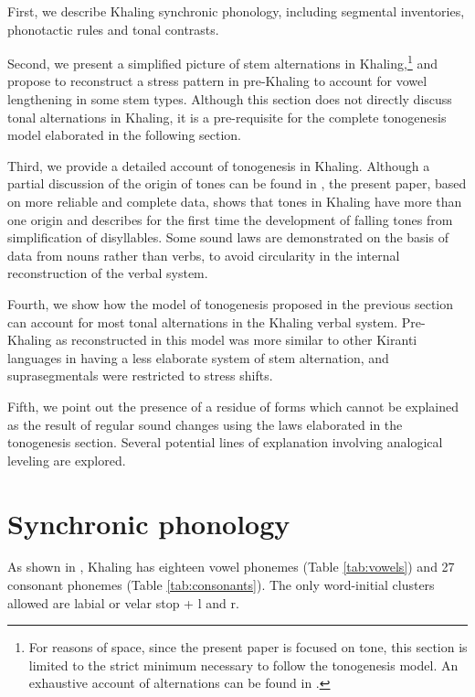 \documentclass[oldfontcommands,oneside,a4paper,11pt]{article}
\newcommand{\ipa}[1]{{\phon \mbox{#1}}} %
\begin{document}
First, we describe  Khaling synchronic phonology, including segmental inventories, phonotactic rules and tonal contrasts. 
 
Second, we present a simplified picture of stem alternations in Khaling,\footnote{For reasons of space, since the present paper is focused on tone, this section is limited to the strict minimum necessary to follow the tonogenesis model. An exhaustive account of alternations can be found in \citet{jacques12khaling}.} and propose to reconstruct a stress pattern in pre-Khaling to account for vowel lengthening in some stem types. Although this section does not directly discuss tonal alternations in Khaling, it is a pre-requisite for the complete tonogenesis model elaborated in the following section.
 
Third, we provide a detailed account of tonogenesis in Khaling. Although a partial discussion of the origin of tones can be found in \citet{michailovsky75khaling}, the present paper, based on more reliable and complete data, shows that tones in Khaling have more than one origin and describes for the first time the development of falling tones from simplification of disyllables. Some sound laws are demonstrated on the basis of data from nouns rather than verbs, to avoid circularity in the internal reconstruction of the verbal system.

Fourth, we show how the model of tonogenesis proposed in the previous section can account for most tonal alternations in the Khaling verbal system. Pre-Khaling as reconstructed in this model was more similar to other Kiranti languages in having a less elaborate system of stem alternation, and suprasegmentals were restricted to stress shifts.

Fifth, we point out the presence of a residue of forms which cannot be explained as the result of regular sound changes using the laws elaborated in the tonogenesis section. Several potential lines of explanation involving analogical leveling are explored.

\section{Synchronic phonology} \label{sec:synchr}

As shown in \citet[1098]{jacques12khaling}, Khaling has eighteen vowel  phonemes (Table \ref{tab:vowels}) and 27 consonant phonemes (Table \ref{tab:consonants}). The only word-initial clusters allowed are labial or velar stop + \ipa{l} and \ipa{r}. 
\end{document}
